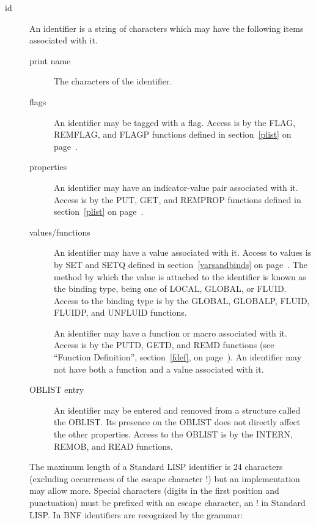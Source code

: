 \begin{description}
\item[id] An identifier is a string of characters which may have the
 
following items associated with it.

\begin{description}
\item[print name]  The characters of the identifier.

\item[flags] An identifier may be tagged with a flag. Access is by the
FLAG, REMFLAG, and FLAGP functions defined in section~\ref{plist} on
page~\pageref{plist}.   

\item[properties]  An identifier may have an
indicator-value pair associated with it. Access is by the PUT, GET,
and REMPROP functions defined in section~\ref{plist} on
page~\pageref{plist}.
  

\item[values/functions] An identifier may have a value associated with
  it. Access to values is by SET and SETQ
defined in   section~\ref{varsandbinds} on
page~\pageref{varsandbinds}. The method by which the value is attached
to the identifier is known as the binding type, being one of LOCAL,
GLOBAL, or FLUID. Access to the binding type is by the GLOBAL,
GLOBALP, FLUID, FLUIDP, and UNFLUID functions.
    

An identifier may have a function or macro associated with it. Access
is by the PUTD, GETD, and REMD functions (see ``Function Definition'',
section~\ref{fdef}, on page~\pageref{fdef}).  
 An identifier may not have both a function and a value
associated with it.

\item[OBLIST entry]  An identifier may be entered and
removed from a structure called the OBLIST. Its presence on the OBLIST
does not directly affect the other properties. Access to the OBLIST is
by the INTERN, REMOB, and READ functions.  
\end{description}

The maximum length of a Standard LISP identifier is 24 characters
(excluding occurrences of the escape character !) but an
implementation may allow more. Special characters (digits in the first
position and punctuation) must be prefixed with an escape character,
an ! in Standard LISP. In BNF identifiers are recognized by the
grammar:



\end{description}
